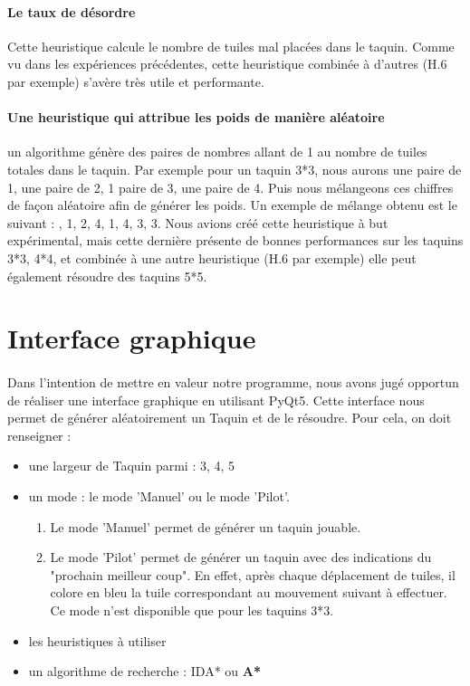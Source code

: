 \documentclass[10pt,a4paper]{report}
\begin{document}
\paragraph{Le taux de désordre}{Cette heuristique calcule le nombre de tuiles mal placées dans le taquin. Comme vu dans les expériences précédentes, cette heuristique combinée à d'autres (H.6 par exemple) s'avère très utile et performante.}
\paragraph{Une heuristique qui attribue les poids de manière aléatoire}{un algorithme génère des paires de nombres allant de 1 au nombre de tuiles totales dans le taquin. Par exemple pour un taquin 3*3, nous aurons une paire de 1, une paire de 2, 1 paire de 3, une paire de 4. Puis nous mélangeons ces chiffres de façon aléatoire afin de générer les poids. Un exemple de mélange obtenu est le suivant : , 1, 2, 4, 1, 4, 3, 3\rbrack. Nous avions créé cette heuristique à but expérimental, mais cette dernière présente de bonnes performances sur les taquins 3*3, 4*4, et combinée à une autre heuristique (H.6 par exemple) elle peut également résoudre des taquins 5*5.}
\section{Interface graphique}
\paragraph{}{Dans l'intention de mettre en valeur notre programme, nous avons jugé opportun de réaliser une interface graphique en utilisant PyQt5. Cette interface nous permet de générer aléatoirement un Taquin et de le résoudre. Pour cela, on doit renseigner : }
\begin{itemize}
\item une largeur de Taquin parmi : 3, 4, 5
\item un mode : le mode 'Manuel' ou le mode 'Pilot'.
\begin{enumerate}
\item Le mode 'Manuel' permet de générer un taquin jouable.
\item Le mode 'Pilot' permet de générer un taquin avec des indications du "prochain meilleur coup". En effet, après chaque déplacement de tuiles, il colore en bleu la tuile correspondant au  mouvement suivant à effectuer. Ce mode n'est disponible que pour les taquins 3*3.
\end{enumerate}
\item les heuristiques à utiliser
\item un algorithme de recherche : IDA* ou \textbf{A*}
\end{itemize}
\end{document}
